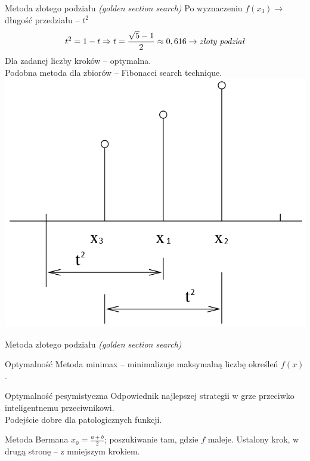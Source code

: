   \begin{frame}{Metoda złotego podziału \emph{(golden section search)}}
    Po wyznaczeniu $f(x_3) \to$ długość przedziału -- $t^{2}$
    \begin{displaymath}
      t^{2} = 1 - t \Rightarrow t = \frac{\sqrt{5} - 1}{2} \approx 0,616 \to \text{\emph{złoty podział}}
    \end{displaymath}
    Dla zadanej liczby kroków -- optymalna.\\
    Podobna metoda dla zbiorów -- Fibonacci search technique.
    \centering
    \includegraphics[height=0.55\textheight]{img/17/fibb}
  \end{frame}

  \begin{frame}{Metoda złotego podziału \emph{(golden section search)}}
    \begin{block}{Optymalność}
      Metoda minimax -- minimalizuje maksymalną liczbę określeń
      $f(x)$.
    \end{block}
    \begin{block}{Optymalność pesymistyczna}
      Odpowiednik najlepszej strategii w grze przeciwko
      inteligentnemu przeciwnikowi.\\
      Podejście dobre dla patologicznych funkcji.
    \end{block}
    \begin{block}{Metoda Bermana}
      $x_{0} = \frac{a + b}{2}$; poszukiwanie tam, gdzie $f$ maleje.
      Ustalony krok, w drugą stronę -- z mniejszym krokiem.
    \end{block}
  \end{frame}

